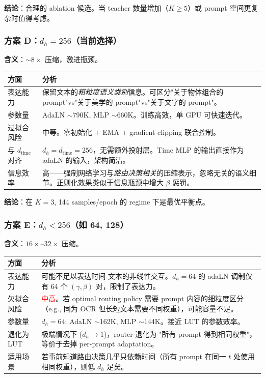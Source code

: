 \documentclass[11pt,a4paper]{article}
\begin{document}
\textbf{结论}：合理的 ablation 候选。当 teacher 数量增加（$K \geq 5$）或 prompt 空间更复杂时值得考虑。

\subsubsection{方案 D：$d_h = 256$（当前选择）}

\textbf{含义}：$\sim 8 \times$ 压缩，激进瓶颈。

\begin{center}
\begin{tabular}{>{\raggedright}p{3cm}|p{9cm}}
\toprule
\textbf{方面} & \textbf{分析} \\
\midrule
表达能力 & 保留文本的\emph{粗粒度语义类别}信息。可区分"关于物体组合的 prompt"vs"关于美学的 prompt"vs"关于文字的 prompt"。\\
参数量 & AdaLN $\sim$790K, MLP $\sim$660K。训练高效，单 GPU 可快速迭代。\\
过拟合风险 & 中等。零初始化 + EMA + gradient clipping 联合控制。\\
与 $d_{\text{time}}$ 对齐 & $d_h = d_{\text{time}} = 256$，无需额外投射层。Time MLP 的输出直接作为 adaLN 的输入，架构简洁。\\
信息效率 & 高——强制网络学习与\emph{路由决策相关}的压缩表示，忽略无关的语义细节。正则化效果类似于信息瓶颈中增大 $\beta$ 惩罚。\\
\bottomrule
\end{tabular}
\end{center}

\textbf{结论}：在 $K = 3$, 144 samples/epoch 的 regime 下是最优平衡点。

\subsubsection{方案 E：$d_h < 256$（如 64, 128）}

\textbf{含义}：$16 \times$--$32 \times$ 压缩。

\begin{center}
\begin{tabular}{>{\raggedright}p{3cm}|p{9cm}}
\toprule
\textbf{方面} & \textbf{分析} \\
\midrule
表达能力 & 可能不足以表达时间-文本的非线性交互。$d_h = 64$ 的 adaLN 调制仅有 64 个 $(\gamma, \beta)$ 对，限制了表达力。\\
欠拟合风险 & \textcolor{red}{中高}。若 optimal routing policy 需要 prompt 内容的细粒度区分（e.g., 同为 OCR 但长短文本需要不同权重），可能容量不足。\\
参数量 & $d_h = 64$: AdaLN $\sim$162K, MLP $\sim$144K。接近 LUT 的参数效率。\\
退化为 LUT & 极端情况下 ($d_h \to 1$)，router 退化为 "所有 prompt 得到相同权重"，等价于去掉 per-prompt adaptation。\\
适用场景 & 若事前知道路由决策几乎只依赖时间（所有 prompt 在同一 $t$ 处使用相同权重），则低 $d_h$ 足矣。\\
\bottomrule
\end{tabular}
\end{center}
\end{document}
